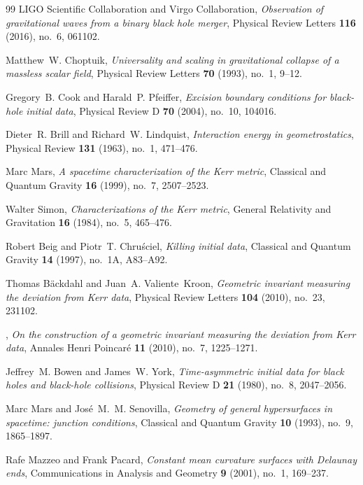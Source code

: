 \begin{thebibliography}{99}
LIGO Scientific Collaboration and Virgo Collaboration, \emph{Observation of gravitational waves from a binary black hole merger}, Physical Review Letters \textbf{116} (2016), no.~6, 061102.

Matthew~W. Choptuik, \emph{Universality and scaling in gravitational collapse of a massless scalar field}, Physical Review Letters \textbf{70} (1993), no.~1, 9--12.

Gregory~B. Cook and Harald~P. Pfeiffer, \emph{Excision boundary conditions for black-hole initial data}, Physical Review D \textbf{70} (2004), no.~10, 104016.

Dieter~R. Brill and Richard~W. Lindquist, \emph{Interaction energy in geometrostatics}, Physical Review \textbf{131} (1963), no.~1, 471--476.

Marc Mars, \emph{A spacetime characterization of the Kerr metric}, Classical and Quantum Gravity \textbf{16} (1999), no.~7, 2507--2523.

Walter Simon, \emph{Characterizations of the Kerr metric}, General Relativity and Gravitation \textbf{16} (1984), no.~5, 465--476.

Robert Beig and Piotr~T. Chru\'sciel, \emph{Killing initial data}, Classical and Quantum Gravity \textbf{14} (1997), no.~1A, A83--A92.

Thomas B\"ackdahl and Juan~A. Valiente~Kroon, \emph{Geometric invariant measuring the deviation from Kerr data}, Physical Review Letters \textbf{104} (2010), no.~23, 231102.

\bysame, \emph{On the construction of a geometric invariant measuring the deviation from Kerr data}, Annales Henri Poincar\'e \textbf{11} (2010), no.~7, 1225--1271.

Jeffrey~M. Bowen and James~W. York, \emph{Time-asymmetric initial data for black holes and black-hole collisions}, Physical Review D \textbf{21} (1980), no.~8, 2047--2056.

Marc Mars and Jos\'e~M.~M. Senovilla, \emph{Geometry of general hypersurfaces in spacetime: junction conditions}, Classical and Quantum Gravity \textbf{10} (1993), no.~9, 1865--1897.

Rafe Mazzeo and Frank Pacard, \emph{Constant mean curvature surfaces with Delaunay ends}, Communications in Analysis and Geometry \textbf{9} (2001), no.~1, 169--237.


\end{thebibliography}
